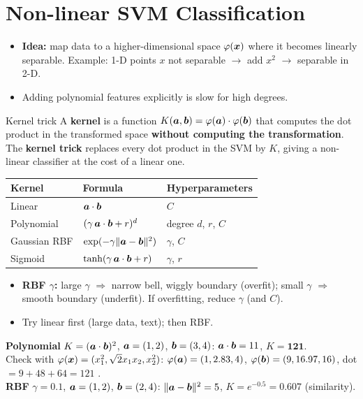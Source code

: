 \section{Non-linear SVM Classification}
\begin{itemize}
  \item \textbf{Idea:} map data to a higher-dimensional space $\varphi(\boldsymbol{x})$ where it becomes linearly separable. Example: 1-D points $x$ not separable $\to$ add $x^2$ $\to$ separable in 2-D.
  \item Adding polynomial features explicitly is slow for high degrees.
\end{itemize}
\begin{dfn}{Kernel trick}
A \textbf{kernel} is a function $K(\boldsymbol{a},\boldsymbol{b})=\varphi(\boldsymbol{a})\cdot\varphi(\boldsymbol{b})$ that computes the dot product in the transformed space \textbf{without computing the transformation}. The \textbf{kernel trick} replaces every dot product in the SVM by $K$, giving a non-linear classifier at the cost of a linear one.
\end{dfn}
\begin{center}
\small
\begin{tabular}{@{}lll@{}}
\toprule
\textbf{Kernel} & \textbf{Formula} & \textbf{Hyperparameters}\\
\midrule
Linear & $\boldsymbol{a}\cdot\boldsymbol{b}$ & $C$\\
Polynomial & $(\gamma\,\boldsymbol{a}\cdot\boldsymbol{b}+r)^d$ & degree $d$, $r$, $C$\\
Gaussian RBF & $\exp(-\gamma\|\boldsymbol{a}-\boldsymbol{b}\|^2)$ & $\gamma$, $C$\\
Sigmoid & $\tanh(\gamma\,\boldsymbol{a}\cdot\boldsymbol{b}+r)$ & $\gamma$, $r$\\
\bottomrule
\end{tabular}
\end{center}
\begin{itemize}
  \item \textbf{RBF $\gamma$:} large $\gamma$ $\Rightarrow$ narrow bell, wiggly boundary (overfit); small $\gamma$ $\Rightarrow$ smooth boundary (underfit). If overfitting, reduce $\gamma$ (and $C$).
  \item Try linear first (large data, text); then RBF.
\end{itemize}
\begin{numer}[: kernels]
\textbf{Polynomial} $K=(\boldsymbol{a}\cdot\boldsymbol{b})^2$, $\boldsymbol{a}=(1,2)$, $\boldsymbol{b}=(3,4)$: $\boldsymbol{a}\cdot\boldsymbol{b}=11$, $K=\mathbf{121}$.\\
Check with $\varphi(\boldsymbol{x})=(x_1^2,\sqrt2x_1x_2,x_2^2)$: $\varphi(\boldsymbol{a})=(1,2.83,4)$, $\varphi(\boldsymbol{b})=(9,16.97,16)$, dot $=9+48+64=121$ \checkmark.\\
\textbf{RBF} $\gamma=0.1$, $\boldsymbol{a}=(1,2)$, $\boldsymbol{b}=(2,4)$: $\|\boldsymbol{a}-\boldsymbol{b}\|^2=5$, $K=e^{-0.5}=\mathbf{0.607}$ (similarity).
\end{numer}
